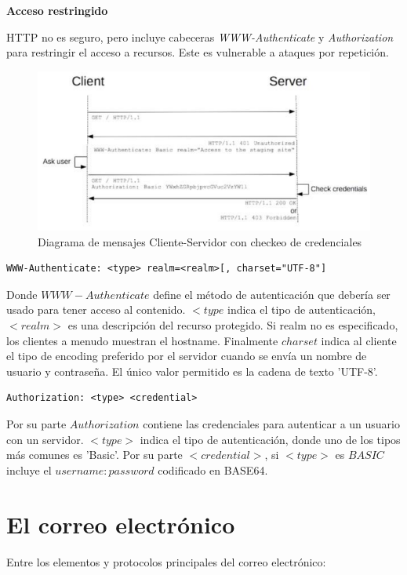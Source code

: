 \documentclass[a4paper,11pt]{article}
\begin{document}
\textbf{Acceso restringido}

HTTP no es seguro, pero incluye cabeceras \textit{WWW-Authenticate} y \textit{Authorization} para restringir el acceso a recursos. Este es vulnerable a ataques por repetición.

\begin{figure}[h]
\centering
\caption{Diagrama de mensajes Cliente-Servidor con checkeo de credenciales}
\includegraphics[scale=1,width=1\textwidth]{diagrama_cliente_servidor.png}
\end{figure}

\begin{verbatim}
WWW-Authenticate: <type> realm=<realm>[, charset="UTF-8"]
\end{verbatim}

Donde $WWW-Authenticate$ define el método de autenticación que debería ser usado para tener acceso al contenido. $<type$ indica el tipo de autenticación, $<realm>$ es una descripción del recurso protegido. Si realm no es especificado, los clientes a menudo muestran el hostname. Finalmente $charset$ indica al cliente el tipo de encoding preferido por el servidor cuando se envía un nombre de usuario y contraseña. El único valor permitido es la cadena de texto 'UTF-8'.

\begin{verbatim}
Authorization: <type> <credential>
\end{verbatim}

Por su parte $Authorization$ contiene las credenciales para autenticar a un usuario con un servidor. $<type>$ indica el tipo de autenticación, donde uno de los tipos más comunes es 'Basic'. Por su parte $<credential>$, si $<type>$ es $BASIC$ incluye el $username:password$ codificado en BASE64.

\section{El correo electrónico}
Entre los elementos y protocolos principales del correo electrónico:
\end{document}
